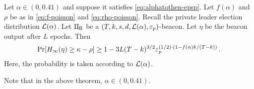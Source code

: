 \begin{theorem}\label{thm:beacon-poisson-multi-epoch}
  Let $\alpha \in (0, 0.41)$ and suppose it satisfies \eqref{eq:alphatothen-epsp}.
  Let $f(\alpha)$ and $\rho$ be as in \eqref{eq:f-poisson} and \eqref{eq:rho-poisson}.
  Recall the private leader election distribution $\mathcal{L}(\alpha)$.
  Let $\Pi_{\mathsf{B}}$ be a $(T,k,s,d,\mathcal{L}(\alpha), \mathsf{\varepsilon}_p)$-beacon.
  Let $\eta$ be the beacon output after $L$ epochs. 
  Then 
  $$
    \Pr[H_\infty(\eta) \geq \kappa - \rho ] \geq 
      1 -  3 L (T - k)^{3/2} \mathsf{\varepsilon}_p^{ (1/2) \cdot \left( 1 - f(\alpha)k/(T-k) \right)}
    \,.
  $$
  Here, the probability is taken according to $\mathcal{L}(\alpha)$.
\end{theorem}
\noindent
Note that in the above theorem, $\alpha \in (0, 0.41)$.